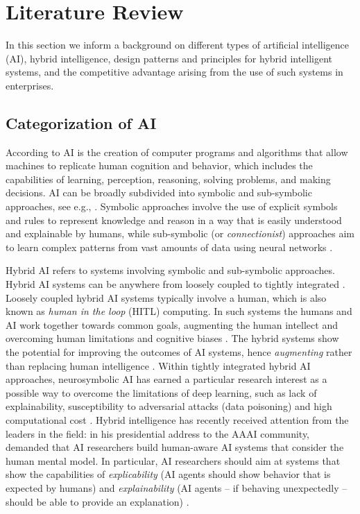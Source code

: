 \section{Literature Review}
\label{sec:literature}

In this section we inform a background on different types of artificial intelligence (AI), hybrid intelligence, 
design patterns and principles for hybrid intelligent systems, and the competitive advantage arising from
the use of such systems in enterprises.

\subsection{Categorization of AI}

According to \cite{russel2010} AI is the creation of computer programs and algorithms that allow machines to
replicate human cognition and behavior, which includes the capabilities of learning, perception, reasoning,
solving problems, and making decisions. AI can be broadly subdivided into symbolic and sub-symbolic approaches,
see e.g., \cite{eliasmithSymbolicSubsymbolic2006}. Symbolic approaches involve the use of explicit symbols and
rules to represent knowledge and reason in a way that is easily understood and explainable by humans, while sub-symbolic
(or \textit{connectionist}) approaches aim to learn complex patterns from vast amounts of data using neural
networks \citep{ilkouSymbolicVsSubsymbolic2020}.

Hybrid AI refers to systems involving symbolic and sub-symbolic approaches. Hybrid AI systems can be anywhere from
loosely coupled to tightly integrated \citep{garcezNeurosymbolicAI3rd2020}. Loosely coupled hybrid AI systems typically
involve a human, which is also known as \textit{human in the loop} (HITL) computing. In such systems the humans and
AI work together towards common goals, augmenting the human intellect and overcoming human limitations and cognitive
biases \citep{akataResearchAgendaHybrid2020}. The hybrid systems show the  potential for improving the outcomes of AI
systems, hence \textit{augmenting} rather than replacing human intelligence \citep{akataResearchAgendaHybrid2020}.
Within tightly integrated hybrid AI approaches, neurosymbolic AI has earned a particular research interest as a possible
way to overcome the limitations of deep learning, such as lack of explainability, susceptibility to adversarial attacks
(data poisoning) and high computational cost \citep{garcezNeurosymbolicAI3rd2020}. Hybrid intelligence has recently
received attention from the leaders in the field: in his presidential address to the AAAI community, 
\cite{kambhampatiChallengesHumanAwareAI2020} demanded that AI researchers build human-aware AI systems that consider
the human mental model. In particular, AI researchers should aim at systems that show the capabilities of \textit{explicability}
(AI agents should show behavior that is expected by humans) and \textit{explainability} (AI agents -- if behaving unexpectedly -- 
should be able to provide an explanation) \citep{kambhampatiChallengesHumanAwareAI2020}.

